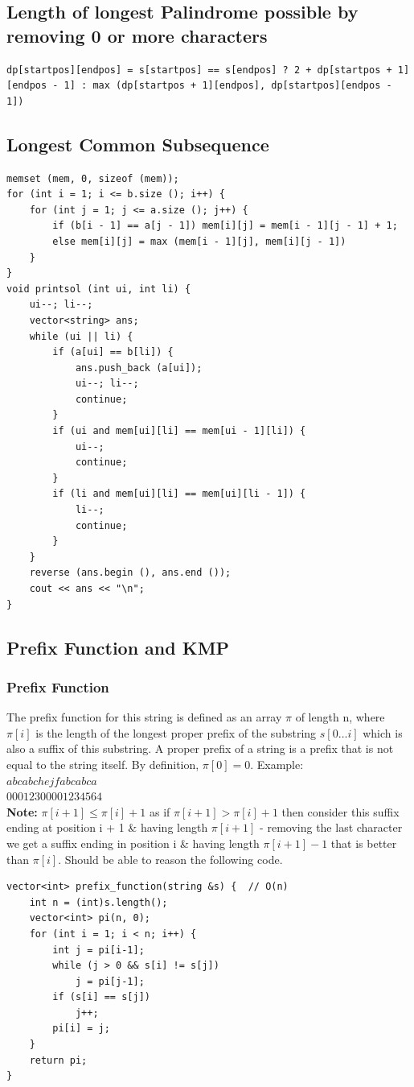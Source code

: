 \documentclass[8pt, a4paper, oneside, twocolumn]{extarticle}
\begin{document}
\subsection{Length of longest Palindrome possible by removing 0 or more characters}
\begin{verbatim}
dp[startpos][endpos] = s[startpos] == s[endpos] ? 2 + dp[startpos + 1][endpos - 1] : max (dp[startpos + 1][endpos], dp[startpos][endpos - 1])
\end{verbatim}
\subsection{Longest Common Subsequence}
\begin{verbatim}
memset (mem, 0, sizeof (mem));
for (int i = 1; i <= b.size (); i++) {
	for (int j = 1; j <= a.size (); j++) {
		if (b[i - 1] == a[j - 1]) mem[i][j] = mem[i - 1][j - 1] + 1;
		else mem[i][j] = max (mem[i - 1][j], mem[i][j - 1])
	}
}
void printsol (int ui, int li) {
	ui--; li--;
	vector<string> ans;
	while (ui || li) {
		if (a[ui] == b[li]) {
			ans.push_back (a[ui]);
			ui--; li--;
			continue;
		}
		if (ui and mem[ui][li] == mem[ui - 1][li]) {
			ui--;
			continue;
		}
		if (li and mem[ui][li] == mem[ui][li - 1]) {
			li--;
			continue;
		}
	}
	reverse (ans.begin (), ans.end ());
	cout << ans << "\n";
}
\end{verbatim}
\subsection{Prefix Function and KMP}
\subsubsection{Prefix Function}
The prefix function for this string is defined as an array $\pi$ of length n, where $\pi[i]$ is the length of the longest proper prefix of the substring $s[0 … i]$ which is also a suffix of this substring. A proper prefix of a string is a prefix that is not equal to the string itself. By definition, $\pi[0]=0$. Example:\\
$abcabchejfabcabca$\\
$00012300001234564$\\
\textbf{Note: } $\pi[i + 1] \leq \pi[i] + 1$ as if $\pi[i + 1] > \pi[i] + 1$ then consider this suffix ending at position i + 1 \& having length $\pi[i + 1]$ - removing the last character we get a suffix ending in position i \& having length $\pi[i + 1] - 1$ that is better than $\pi[i]$. Should be able to reason the following code.
\begin{verbatim}
vector<int> prefix_function(string &s) {  // O(n)
    int n = (int)s.length();
    vector<int> pi(n, 0);
    for (int i = 1; i < n; i++) {
        int j = pi[i-1];
        while (j > 0 && s[i] != s[j])
            j = pi[j-1];
        if (s[i] == s[j])
            j++;
        pi[i] = j;
    }
    return pi;
}
\end{verbatim}
\end{document}
